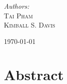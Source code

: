 \documentclass[11pt]{article}
\begin{document}
\begin{titlepage}
	
	{\Large\textit{Authors:}}\\
 	\Large\textsc{Tai Pham}\\
	 \Large\textsc{Kimball S. Davis} %
	
	
	\vfill\vfill\vfill %
	
	{\large\today} %
	
	
	 
	
	\vfill %
	
\end{titlepage}



\section*{Abstract}
\end{document}

